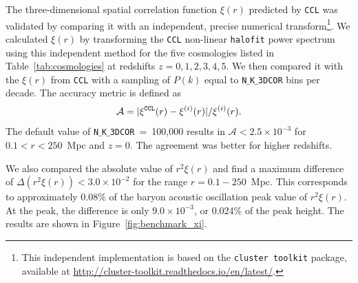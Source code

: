 \documentclass[\docopts]{\docclass}
\newcommand{\ccl}{{\tt CCL}\xspace}
\newcommand{\halofit}{{\tt halofit}\xspace}
\begin{document}
The three-dimensional spatial correlation function $\xi(r)$ predicted by \ccl was validated by comparing it with an independent, precise numerical transform\footnote{This independent implementation is based on the {\tt cluster toolkit} package, available at \url{http://cluster-toolkit.readthedocs.io/en/latest/}.}. We calculated $\xi(r)$  by transforming the \ccl non-linear \halofit power spectrum using this independent method for the five cosmologies listed in Table~\ref{tab:cosmologies} at redshifts $z = 0,1,2,3,4,5$.  We then compared it with the $\xi(r)$ from \ccl with a sampling of $P(k)$ equal to {\tt N$\_$K$\_$3DCOR} bins per decade. The accuracy metric is defined as
\begin{equation}
	\mathcal{A}=|\xi^{\tt CCL}(r)-\xi^{(i)}(r)| / \xi^{(i)}(r).
  \label{eq:accxi}
\end{equation}
The default value of {\tt N$\_$K$\_$3DCOR}~=~100,000 results in $\mathcal{A} < 2.5 \times 10^{-3}$ for $0.1 < r < 250$~Mpc and $z=0$. The agreement was better for higher redshifts.

We also compared the absolute value of $r^2 \xi(r)$ and find a maximum difference of $\Delta (r^2 \xi(r)) < 3.0 \times 10^{-2}$ for the range $r = 0.1 - 250$~Mpc. This corresponds to approximately $0.08\%$ of the baryon acoustic oscillation peak value of $r^2 \xi(r)$. At the peak, the difference is only $9.0 \times 10^{-3}$, or 0.024\% of the peak height. The results are shown in Figure~\ref{fig:benchmark_xi}.
\end{document}
